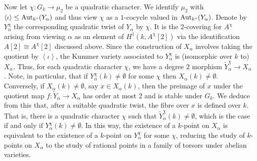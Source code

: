 \documentclass[10pt]{amsart}
\numberwithin{equation}{section}
\theoremstyle{remark}
\theoremstyle{definition}
\newtheorem{example}[equation]{Example}
\theoremstyle{definition}
\theoremstyle{definition}
\theoremstyle{definition}
\theoremstyle{definition}
\theoremstyle{definition}
\theoremstyle{definition}
\theoremstyle{definition}
\begin{document}
Now let $\chi:G_k\to \mu_2$ be a quadratic character. We identify $\mu_2$ with $\left \langle \iota \right \rangle \leq \textup{Aut}_{k^s}(Y_\alpha)$ and thus view $\chi$ as a $1$-cocycle valued in  $\textup{Aut}_{k^s}(Y_\alpha)$. Denote by $Y_\alpha^\chi$ the corresponding quadratic twist of $Y_\alpha$ by $\chi$. It is the $2$-covering for $A^\chi$ arising from viewing $\alpha$ as an element of $H^1(k,A^\chi[2])$ via the identification $A[2]\cong A^\chi[2]$ discussed above. Since the construction of $X_\alpha$ involves taking the quotient by $\left \langle\iota \right \rangle$, the Kummer variety associated to $Y_\alpha^\chi$ is (isomorphic over $k$ to) $X_\alpha$. Thus, for each quadratic character $\chi$, we have a degree $2$ morphism $\widetilde{Y}_\alpha^\chi\to X_\alpha$. Note, in particular, that if $Y_\alpha^\chi(k)\neq \emptyset$ for some $\chi$ then $X_\alpha(k)\neq \emptyset$. Conversely, if $X_\alpha(k)\neq \emptyset$, say $x\in X_\alpha(k)$, then the preimage of $x$ under the quotient map $f:\widetilde{Y}_\alpha\to X_\alpha$   has order at most $2$ and is stable under $G_k$. We deduce from this that, after a suitable quadratic twist, the fibre over $x$ is defined over $k$. That is, there is a quadratic character $\chi$ such that $\widetilde{Y}_\alpha^\chi(k)\neq \emptyset$, which is the case if and only if $Y_\alpha^\chi(k)\neq \emptyset$. In this way, the existence of a $k$-point on $X_\alpha$ is equivalent to the existence of a $k$-point on  $Y_\alpha^\chi$ for some $\chi$, reducing the study of $k$-points on $X_\alpha$ to the study of rational points in a family of torsors under abelian varieties.





\end{document}
